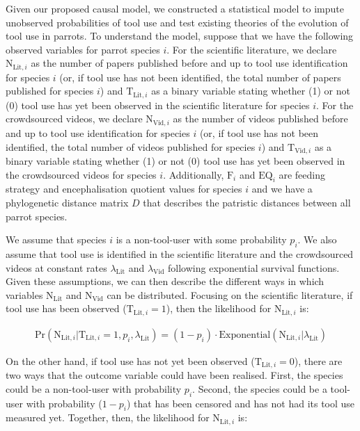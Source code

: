 \documentclass[
  man, donotrepeattitle,floatsintext]{apa6}
\begin{document}
Given our proposed causal model, we constructed a statistical model to impute
unobserved probabilities of tool use and test existing theories of the evolution
of tool use in parrots. To understand the model, suppose that we have the
following observed variables for parrot species \(i\). For the scientific
literature, we declare \(\text{N}_{\text{Lit},i}\) as the number of papers
published before and up to tool use identification for species \(i\) (or, if tool
use has not been identified, the total number of papers published for species
\(i\)) and \(\text{T}_{\text{Lit},i}\) as a binary variable stating whether (1) or
not (0) tool use has yet been observed in the scientific literature for species
\(i\). For the crowdsourced videos, we declare \(\text{N}_{\text{Vid},i}\) as the
number of videos published before and up to tool use identification for species
\(i\) (or, if tool use has not been identified, the total number of videos
published for species \(i\)) and \(\text{T}_{\text{Vid},i}\) as a binary variable
stating whether (1) or not (0) tool use has yet been observed in the
crowdsourced videos for species \(i\). Additionally, \(\text{F}_i\) and
\(\text{EQ}_i\) are feeding strategy and encephalisation quotient values for
species \(i\) and we have a phylogenetic distance matrix \(D\) that describes the
patristic distances between all parrot species.

We assume that species \(i\) is a non-tool-user with some
probability \(p_i\). We also assume that tool use is identified in the scientific
literature and the crowdsourced videos at constant rates \(\lambda_{\text{Lit}}\)
and \(\lambda_{\text{Vid}}\) following exponential survival functions. Given these
assumptions, we can then describe the different ways in which variables
\(\text{N}_\text{Lit}\) and \(\text{N}_\text{Vid}\) can be distributed. Focusing on
the scientific literature, if tool use has been observed
(\(\text{T}_{\text{Lit},i} = 1\)), then the likelihood for
\(\text{N}_{\text{Lit},i}\) is:

\begin{align}
\text{Pr}(\text{N}_{\text{Lit},i}|\text{T}_{\text{Lit},i} = 1,p_i,\lambda_\text{Lit}) = (1-p_i)\cdot\text{Exponential}(\text{N}_{\text{Lit},i}|\lambda_\text{Lit})
\end{align}

On the other hand, if tool use has not yet been observed
(\(\text{T}_{\text{Lit},i} = 0\)), there are two ways that the outcome variable
could have been realised. First, the species could be a non-tool-user with
probability \(p_i\). Second, the species could be a tool-user with probability
(\(1 - p_i\)) that has been censored and has not had its tool use measured yet.
Together, then, the likelihood for \(\text{N}_{\text{Lit},i}\) is:
\end{document}
